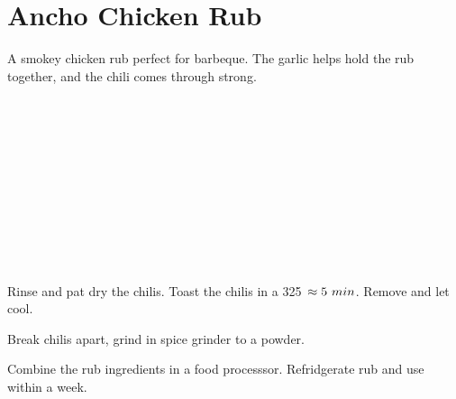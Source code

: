 \section[Ancho Rub]{Ancho Chicken Rub~\vegan}


\begin{recipestats}[
	servings=10 \fluidounce,
	preptime=30 \minute,
	source=Mike \& Jane,
]
\end{recipestats}


\begin{recipeabstract}
	A smokey chicken rub perfect for barbeque.
	The garlic helps hold the rub together, and the chili comes through strong.
\end{recipeabstract}


\begin{ingredientcolumns}
	\begin{ingredientblock}[rub]
		\\
		\\
		\\
		\\
		\\
		\\
	\end{ingredientblock}
	\begin{ingredientblock}
		\\
		\\
		\\
	\end{ingredientblock}
\end{ingredientcolumns}


\begin{preparation}
\item Rinse and pat dry the chilis.
	Toast the chilis in a 325~\Fahrenheit $\approx5~\minute$.
	Remove and let cool.

\item Break chilis apart, grind in spice grinder to a powder.

\item Combine the rub ingredients in a food processsor.
	Refridgerate rub and use within a week.
\end{preparation}


